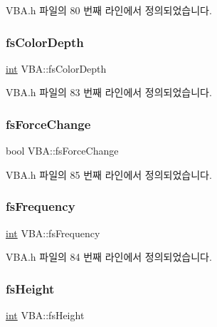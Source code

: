 V\+B\+A.\+h 파일의 80 번째 라인에서 정의되었습니다.

\mbox{\label{class_v_b_a_a1baf02b3f4ad129bfd713f1a132e96b9}} 
\subsubsection{\texorpdfstring{fs\+Color\+Depth}{fsColorDepth}}
{\footnotesize\ttfamily \mbox{\hyperlink{_util_8cpp_a0ef32aa8672df19503a49fab2d0c8071}{int}} V\+B\+A\+::fs\+Color\+Depth}



V\+B\+A.\+h 파일의 83 번째 라인에서 정의되었습니다.

\mbox{\label{class_v_b_a_a9374990edcde0964629b3c1c2e868878}} 
\subsubsection{\texorpdfstring{fs\+Force\+Change}{fsForceChange}}
{\footnotesize\ttfamily bool V\+B\+A\+::fs\+Force\+Change}



V\+B\+A.\+h 파일의 85 번째 라인에서 정의되었습니다.

\mbox{\label{class_v_b_a_a5953d6683aed93e49e71bc7617845d9e}} 
\subsubsection{\texorpdfstring{fs\+Frequency}{fsFrequency}}
{\footnotesize\ttfamily \mbox{\hyperlink{_util_8cpp_a0ef32aa8672df19503a49fab2d0c8071}{int}} V\+B\+A\+::fs\+Frequency}



V\+B\+A.\+h 파일의 84 번째 라인에서 정의되었습니다.

\mbox{\label{class_v_b_a_a1e59d9254f1cb6420502c537c35dd5ec}} 
\subsubsection{\texorpdfstring{fs\+Height}{fsHeight}}
{\footnotesize\ttfamily \mbox{\hyperlink{_util_8cpp_a0ef32aa8672df19503a49fab2d0c8071}{int}} V\+B\+A\+::fs\+Height}



